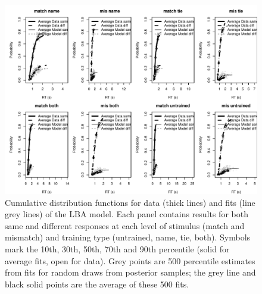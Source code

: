 \documentclass[
  man,floatsintext]{apa6}
\begin{document}
\begin{figure}[H]

{\centering \includegraphics[height=0.67\textheight,]{../../figures/ea/KN_fit} 

}

\caption{Cumulative distribution functions for data (thick lines) and fits (line grey lines) of the LBA model. Each panel contains results for both same and different responses at each level of stimulus (match and mismatch) and training type (untrained, name, tie, both). Symbols mark the 10th, 30th, 50th, 70th and 90th percentile (solid for average fits, open for data). Grey points are 500 percentile estimates from fits for random draws from posterior samples; the grey line and black solid points are the average of these 500 fits.}\label{fig:model-fit-plot}
\end{figure}
\end{document}

